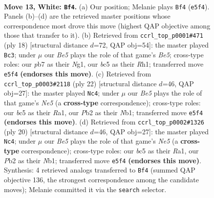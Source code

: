 \documentclass[11pt]{article}
\begin{document}
\clearpage

\begin{figure}[p]\centering
\begin{subfigure}{0.46\textwidth}\centering
\resizebox{\linewidth}{!}{%
\newchessgame
\chessboard[
  setfen={r1b2rk1/pp1n1p2/4pnp1/2b1B2p/2N5/6P1/PP2PPBP/RN1R2K1 w - - 2 13},
  showmover=false,
  pgfstyle=straightmove, color=movearrow, markmove={e5-f4}
]}
\caption{}
\end{subfigure}\hfill
\begin{subfigure}{0.46\textwidth}\centering
\resizebox{\linewidth}{!}{%
\newchessgame
\chessboard[
  setfen={r1bb1rk1/ppp3pp/2n2n2/4Bp2/2P5/1P2P3/P3BPPP/RN2K1NR w KQ - 1 10},
  showmover=false,
  pgfstyle=straightmove, color=movearrow, markmove={e5-c3}
]}
\caption{}
\end{subfigure}
\\[4pt]
\begin{subfigure}{0.46\textwidth}\centering
\resizebox{\linewidth}{!}{%
\newchessgame
\chessboard[
  setfen={r1b2rk1/1p1n1ppp/p3pn2/2b1N3/8/4P3/PP2BPPP/RNBR2K1 w - - 4 12},
  showmover=false,
  pgfstyle=straightmove, color=movearrow, markmove={e5-c4}
]}
\caption{}
\end{subfigure}\hfill
\begin{subfigure}{0.46\textwidth}\centering
\resizebox{\linewidth}{!}{%
\newchessgame
\chessboard[
  setfen={r1b2rk1/1p1n1ppp/p3pn2/2b1N3/8/4P3/PP2BPPP/RNBR2K1 w - - 4 11},
  showmover=false,
  pgfstyle=straightmove, color=movearrow, markmove={e5-c4}
]}
\caption{}
\end{subfigure}
\caption{\textbf{Move 13, White: \texttt{Bf4}.} (a) Our position; Melanie plays \texttt{Bf4} (\texttt{e5f4}). Panels (b)--(d) are the retrieved master positions whose correspondence most drove this move (highest QAP objective among those that transfer to it). (b) Retrieved from \texttt{ccrl\_top\_p0001\#471} (ply 18) [structural distance $d$=72, QAP obj=54]: the master played \texttt{Bc3}; under $\mu$ our \emph{Be5} plays the role of that game's \emph{Be5}; cross-type roles: our \emph{p}b7 as their \emph{N}g1, our \emph{b}c5 as their \emph{R}h1; transferred move \texttt{e5f4} \textbf{(endorses this move)}. (c) Retrieved from \texttt{ccrl\_top\_p0003\#2118} (ply 22) [structural distance $d$=46, QAP obj=27]: the master played \texttt{Nc4}; under $\mu$ our \emph{Be5} plays the role of that game's \emph{Ne5} (a \textbf{cross-type} correspondence); cross-type roles: our \emph{b}c5 as their \emph{R}a1, our \emph{P}b2 as their \emph{N}b1; transferred move \texttt{e5f4} \textbf{(endorses this move)}. (d) Retrieved from \texttt{ccrl\_top\_p0002\#1326} (ply 20) [structural distance $d$=46, QAP obj=27]: the master played \texttt{Nc4}; under $\mu$ our \emph{Be5} plays the role of that game's \emph{Ne5} (a \textbf{cross-type} correspondence); cross-type roles: our \emph{b}c5 as their \emph{R}a1, our \emph{P}b2 as their \emph{N}b1; transferred move \texttt{e5f4} \textbf{(endorses this move)}. Synthesis: 4 retrieved analogs transferred to \texttt{Bf4} (summed QAP objective 136, the strongest correspondence among the candidate moves); Melanie committed it via the \texttt{search} selector.}
\label{fig:thought-m24}
\end{figure}
\end{document}
